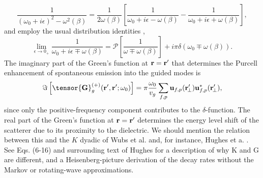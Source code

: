 \documentclass[preprint,aps,pra,onecolumn]{revtex4-1} %
\newcommand{\comment}[1]{{\color{Maroon} #1}}
\begin{document}
\begin{equation}
\frac{1}{(\omega_0+i\epsilon)^2-\omega^2(\beta)}=\frac{1}{2 \omega(\beta)}\left[ \frac{1}{\omega_0+ i 
\epsilon - \omega(\beta)} - \frac{1}{\omega_0+ i \epsilon + \omega(\beta)} \right],
\end{equation}
 and employ the usual distribution identities \cite{sondergaard_general_2001},
\begin{equation}
\lim_{\epsilon \rightarrow 0_+} \frac{1}{\omega_0 + i \epsilon \mp 
\omega(\beta)}=\mathcal{P}\left[\frac{1}{\omega \mp \omega(\beta)} \right] + i \pi \delta (\omega_0 \mp 
\omega(\beta)).
\end{equation}
The imaginary part of the Green's function at $\mathbf{r} = \mathbf{r}'$ that determines the Purcell enhancement of spontaneous emission into the guided modes is \cite{PrinciplesofNano-Optics}
	\begin{equation}
		\Im\left[\tensor{\mathbf{G}}^{(+)}_g(\br',\br'; \omega_0) \right] = \pi \frac{\omega_0}{v_g } \sum_{f, p} 
		\mathbf{u}_{f, p} (\br_{\!\perp}^\prime)\mathbf{u}^*_{f , p} (\br_{\!\perp}^\prime),
	\end{equation}
since only the positive-frequency component contributes to the $\delta$-function.  The real part of the Green's function at $\mathbf{r} = \mathbf{r}'$ determines the energy level shift of the scatterer due to its proximity to the dielectric.  \comment{We should mention the relation between this and the $K$ dyadic of Wubs et al. \cite{wubs_multiple-scattering_2004} and, for instance, Hughes et a. \cite{yao_ultrahigh_2009}.  See Eqs. (6-16) and surrounding text of Hughes for a description of why K and G are different, and a Heisenberg-picture derivation of the decay rates without the Markov or rotating-wave approximations. }
\end{document}
